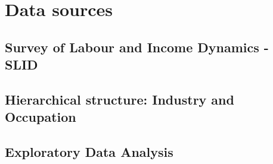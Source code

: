 \chapter{Data sources}

\section{Survey of Labour and Income Dynamics - SLID}
\section{Hierarchical structure: Industry and Occupation}
\section{Exploratory Data Analysis}